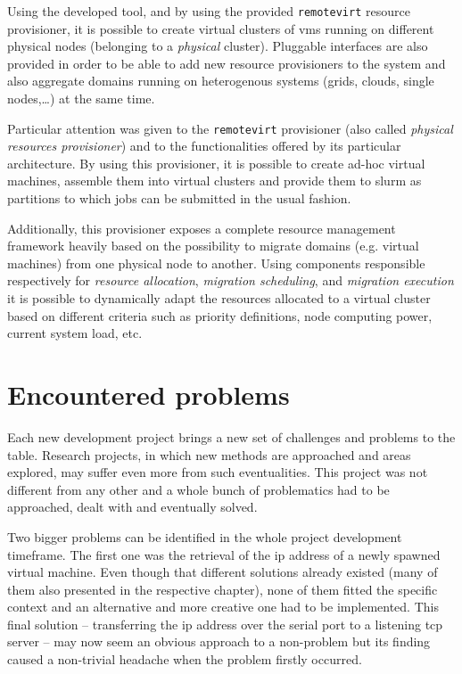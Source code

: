 Using the developed tool, and by using the provided \texttt{remotevirt} resource provisioner, it is possible to create virtual clusters of \glspl{vm} running on different physical nodes (belonging to a \emph{physical} cluster). Pluggable interfaces are also provided in order to be able to add new resource provisioners to the system and also aggregate domains running on heterogenous systems (grids, clouds, single nodes,…) at the same time.

Particular attention was given to the \texttt{remotevirt} provisioner (also called \emph{physical resources provisioner}) and to the functionalities offered by its particular architecture. By using this provisioner, it is possible to create ad-hoc virtual machines, assemble them into virtual clusters and provide them to \gls{slurm} as partitions to which jobs can be submitted in the usual fashion.

Additionally, this provisioner exposes a complete resource management framework heavily based on the possibility to migrate domains (e.g. virtual machines) from one physical node to another. Using components responsible respectively for \emph{resource allocation}, \emph{migration scheduling}, and \emph{migration execution} it is possible to dynamically adapt the resources allocated to a virtual cluster based on different criteria such as priority definitions, node computing power, current system load, etc.



\section{Encountered problems}
\label{sec:problems}

Each new development project brings a new set of challenges and problems to the table. Research projects, in which new methods are approached and areas explored, may suffer even more from such eventualities. This project was not different from any other and a whole bunch of problematics had to be approached, dealt with and eventually solved.

Two bigger problems can be identified in the whole project development timeframe. The first one was the retrieval of the \gls{ip} address of a newly spawned virtual machine. Even though that different solutions already existed (many of them also presented in the respective chapter), none of them fitted the specific context and an alternative and more creative one had to be implemented. This final solution -- transferring the \gls{ip} address over the serial port to a listening \gls{tcp} server -- may now seem an obvious approach to a non-problem but its finding caused a non-trivial headache when the problem firstly occurred.

